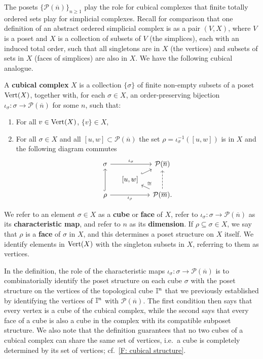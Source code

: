 The posets $\{\mathcal P(\overline n)\}_{n \geq 1}$ play the role for cubical complexes that finite totally ordered sets play for simplicial complexes.
Recall for comparison that one definition of an abstract ordered simplicial complex is as a pair $(V, X)$, where $V$ is a poset and $X$ is a collection of subsets of $V$ (the simplices), each with an induced total order, such that all singletons are in $X$ (the vertices) and subsets of sets in $X$ (faces of simplices) are also in $X$.
We have the following cubical analogue.

\begin{definition}\label{D:cubical}
	A \textbf{cubical complex} $X$ is a collection $\{ \sigma \}$ of finite non-empty subsets of a poset
	${\rm Vert}(X)$, together with, for each $\sigma \in X$, an order-preserving bijection $\iota_\sigma \colon \sigma \to \mathcal P(\overline n)$ for some $n$, such that:
	\begin{enumerate}
		\item For all $v \in {\rm Vert}(X)$, $\{v\} \in X$,
		\item For all $\sigma \in X$ and all $[u,w] \subset \mathcal P(\overline n)$ the set $\rho = \iota_\sigma^{-1}([u,w])$ is in  $X$ and the following diagram commutes
		\begin{equation*}
			\begin{tikzcd} [row sep = tiny, column sep = small]
				\sigma \arrow[rr, "\iota_\sigma"] && \mathcal P(\overline n) \\
				& [-5pt] {[}u,w{]} \arrow[ur, hook] & \\
				\rho \arrow[uu, hook] \arrow[rr, "\iota_\rho"'] && \mathcal P(\overline m).
				\arrow[ul, "\cong"'] \arrow[uu, dashed]
			\end{tikzcd}
		\end{equation*}
	\end{enumerate}
	We refer to an element $\sigma \in X$ as a \textbf{cube} or \textbf{face} of $X$, refer to $\iota_\sigma \colon \sigma \to \mathcal P(\overline{n})$ as its \textbf{characteristic map},
	and refer to $n$ as its \textbf{dimension}.
	If $\rho \subseteq \sigma \in X$, we say that $\rho$ is a \textbf{face} of $\sigma$ in $X$, and this determines a poset structure on $X$ itself.
	We identify elements in ${\rm Vert}(X)$ with the singleton subsets in $X$, referring to them as vertices.
\end{definition}

In the definition, the role of the characteristic maps $\iota_\sigma \colon \sigma \to \mathcal P(\overline{n})$ is to combinatorially identify the poset structure on each cube $\sigma$ with the poset structure on the vertices of the topological cube $\mathbb{I}^n$ that we previously established by identifying the vertices of $\mathbb{I}^n$ with $\mathcal P(\overline n)$.
The first condition then says that every vertex is a cube of the cubical complex, while the second says that every face of a cube is also a cube in the complex with its compatible subposet structure.
We also note that the definition guarantees that no two cubes of a cubical complex can share the same set of vertices, i.e.\ a cube is completely determined by its set of vertices; cf.\ \cref{F: cubical structure}.


